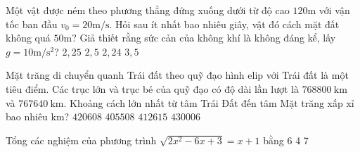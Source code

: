 \begin{ex} %
	Một vật được ném theo phương thẳng đứng xuống dưới từ độ cao $120 \mathrm m$ với vận tốc ban đầu $v_0=20 \mathrm{m / s}$. Hỏi sau ít nhất bao nhiêu giây, vật đó cách mặt đất không quá $50\mathrm m$? Giả thiết rằng sức cản của không khí là không đáng kể, lấy $g=10 \mathrm {m/s^2}$?
	\choice 
	{ $2,25$} 
	{ $2,5$} 
	{\True $2,24$} 
	{ $3,5$}
\end{ex} 
\begin{ex} %
	Mặt trăng di chuyển quanh Trái đất theo quỹ đạo hình elip với Trái đất là một tiêu điểm. Các trục lớn và trục bé của quỹ đạo có độ dài lần lượt là $768800 \mathrm{~km}$ và $767640 \mathrm{~km}$. Khoảng cách lớn nhất từ tâm Trái Đất đến tâm Mặt trăng xấp xỉ bao nhiêu km?
	\choice 
	{ $420608$} 
	{\True $405508$} 
	{ $412615$} 
	{ $430006$}
	 \end{ex} 
\begin{ex} %
	Tổng các nghiệm của phương trình $\sqrt{2 x^2-6 x+3}=x+1$ bằng
	\choice 
	{ 6} 
	{ 4} 
	{} 
	{ 7 }
\end{ex}

